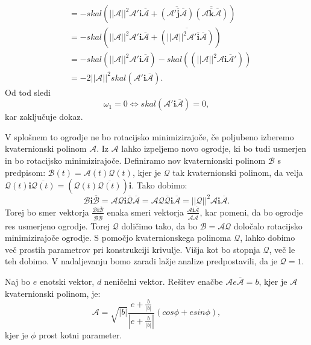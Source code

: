\documentclass[mat1]{fmfdelo}
\newcommand{\ii}{\boldsymbol i}
\newcommand{\jj}{\boldsymbol j}
\newcommand{\kk}{\boldsymbol k}
\newcommand{\A}{\mathcal A}
\newcommand{\B}{\mathcal B}
\newcommand{\QQ}{\mathcal Q}
\begin{document}
\begin{dokaz}
\begin{equation*}
\begin{split}
	&= -skal \left( ||\A||^2 \A' \ii \overline{\A}+ \overline{\left(\A' \overline{\jj} \overline{\A}\right)} \overline{ \left( \A \overline{\kk} \overline{\A} \right) }\right) \\
	&= -skal \left( ||\A||^2 \A' \ii \overline{\A}+ \overline{\left( ||\A||^2 \A' \overline{\ii} \overline{\A}\right)} \right) \\
	&= -skal \left( ||\A||^2 \A' \ii \overline{\A} \right)-skal \left(\left( ||\A||^2 \A \ii \overline{\A}'\right) \right) \\
	&= -2||\A||^2 skal \left( \A' \ii \overline{\A}\right).
\end{split}
\end{equation*}
Od tod sledi
\begin{equation*}
\omega_1 = 0 \Leftrightarrow skal \left( \A' \ii \overline{\A} \right) = 0,
\end{equation*}
kar zaključuje dokaz.
\end{dokaz}
\begin{opomba}
V splošnem to ogrodje ne bo rotacijsko minimizirajoče, če poljubeno izberemo kvaternionski polinom $\A$. Iz $\A$ lahko izpeljemo novo ogrodje, ki bo tudi usmerjen in bo rotacijsko minimizirajoče. Definiramo nov kvaternionski polinom $\B$ s predpisom: $\B(t) = \A(t) \QQ(t)$, kjer je $\QQ$ tak kvaternionski polinom, da velja $\QQ(t) \ii \overline{\QQ(t)} = \left( \QQ(t) \overline{\QQ(t)} \right) \ii$. Tako dobimo:
\begin{equation*}
	\B \ii \overline{\B} = \A \QQ \ii \overline{\QQ} \overline{\A} = \A \QQ \overline{\QQ} \ii \overline{\A} = ||\QQ||^2\A\ii\overline{\A}.
\end{equation*}
Torej bo smer vektorja $\frac{\B \ii \overline{\B}}{\B  \overline{\B}}$ enaka smeri vektorja $\frac{\A \ii \overline{\A}}{\A  \overline{\A}}$, kar pomeni, da bo ogrodje res usmerjeno ogrodje. Torej $\QQ$ doličimo tako, da bo $\B = \A\QQ$ določalo rotacijsko minimizirajoče ogrodje. S pomočjo kvaternionskega polinoma $\QQ$, lahko dobimo več prostih parametrov pri konstrukciji krivulje. Višja kot bo stopnja $\QQ$, več le teh dobimo. V nadaljevanju bomo zaradi lažje analize predpostavili, da je $\QQ=1$.
\end{opomba}

\iffalse

\begin{izrek}
Naj bo $e$ enotski vektor, $d$ neničelni vektor. Rešitev enačbe $\A e \overline{\A} = b$, kjer je $\A$ kvaternionski polinom, je:
\begin{equation*}
	\A = \sqrt{|b|} \frac{e+\frac{b}{|b|}}{|e+\frac{b}{|b|}|} \left( cos \phi + e sin\phi \right),
\end{equation*}
kjer je $\phi$ prost kotni parameter.
\end{izrek}
\end{document}
